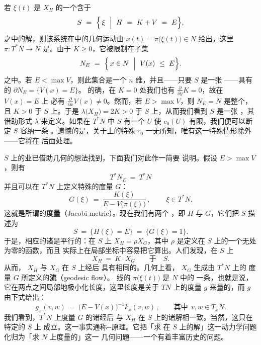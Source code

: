 若 $\xi(t)$ 是\trHamiltonianVectorField{} $X_{H}$ 的一个含于\trInvariant%
\trEnergySurface
\begin{equation}\label{eq:SE-energy-level}
S\ =\ \Bigl\{\,\xi\ \Bigm|\ H\ =\ K+V\ =\ E\Bigr\},
\end{equation}
之中的解，则该系统在\trConfigurationSpace{}中的几何运动由%
$x(t)=\pi\bigl(\xi(t)\bigr)\in N$ 给出，这里 $\pi:T^{*}N\to N$ 是\trProjection。由于%
$K\geq0$，它被限制在子集
\begin{equation}\label{eq:NE-confined}
N_{E}\ =\ \Bigl\{\,x\in N\ \Bigm|\ V(x)\ \leq\ E\Bigr\}.
\end{equation}
之中。若 $E<\max V$，则此集合是一个 $n$ 维\trManifold，并且——只要 $S$ 是一张%
\trRegular\trEnergySurface——具有\trSmooth{}的\trBoundary{} $\partial N_{E}=\bigl\{V(x)=E\bigr\}$。%
的确，在 $K=0$ 处我们也有 $\tfrac{\partial}{\partial y}K=0$，故在 $V(x)=E$ 上%
必有 $\tfrac{\partial}{\partial x}V(x)\neq0$。然而，若 $E>\max V$，则%
$N_{E}=N$ 是整个\trConfigurationSpace，且 $K>0$ 于 $S$ 上。于是%
$\lambda\bigl(X_{H}\bigr)=2K>0$ 于 $S$ 上，从而我们看到 $S$ 是一张%
\trContactType\trHypersurface，其\trContactStructure{}借助\trLiouville{}形式%
$\lambda$ 来定义。如果在 $T^{*}N$ 中 $S$ 有一个\trNeighborhood{} $U$ 使%
\trCapacity{} $c_{0}(U)$ 有限，我们便可以断定 $S$ 容纳一条%
\trClosedCharacteristic。遗憾的是，关于\trCotangentBundle{}上的特殊%
\trCapacity{} $c_{0}$ 一无所知，唯有\trTorus{}这一特殊情形除外——它将在%
后面处理。

$S$ 上的\trPeriodicSolution{}业已借助几何的想法找到，下面我们对此作一简要%
说明。假设 $E>\max V$，则有
\[
T^{*}N_{E}\ =\ T^{*}N
\]
并且可以在 $T^{*}N$ 上定义特殊的\trRiemann{}度量 $G$：
\[
G(\xi)\ =\ \frac{K(\xi)}{E-V\bigl(\pi(\xi)\bigr)}\,,\qquad\ \xi\in T^{*}N.
\]
这就是所谓的\textbf{\trJacobi{}度量}（Jacobi metric）。现在我们有两个%
\trHamiltonianFunction，即 $H$ 与 $G$，它们把 $S$ 描述为\trRegular%
\trEnergySurface
\[
S\ =\ \bigl\{H(\xi)=E\bigr\}\ =\ \bigl\{G(\xi)=1\bigr\}.
\]
于是，相应的诸\trHamiltonianVectorField{}是平行的：在 $S$ 上%
$X_{H}=\rho X_{G}$，其中 $\rho$ 是定义在 $S$ 上的一个无处为零的函数，而且%
实际上在局部坐标中容易把它算出。人们发现，在 $S$ 上
\[
X_{H}\ =\ K\cdot X_{G}\qquad\text{于}\quad S.
\]
从而，\trVectorField{} $X_{H}$ 与 $X_{G}$ 在 $S$ 上经\trReparametrization{}后%
具有相同的\trOrbit。几何上看，\trVectorField{} $X_{G}$ 生成由 $T^{*}N$ 上的%
\trRiemann{}度量 $G$ 所定义的\textbf{\trGeodesic{}流}（geodesic flow）。%
\trFlow{}线的\trProjection{} $\pi\bigl(\xi(t)\bigr)$ 是\trConfigurationSpace{} $N$ 中的%
一条\trGeodesic，也就是说，它在两点之间局部地极小化长度，这里长度是关于%
$TN$ 上的度量 $g$ 来量的，而 $g$ 由下式给出：
\[
g_{x}(v,w)\ =\ \bigl(E-V(x)\bigr)^{-1}k_{x}(v,w)\,,\qquad\text{其中}\ \ %
v,w\in T_{x}N.
\]
我们看到，$T^{*}N$ 上\trRiemann{}度量 $G$ 的诸\trGeodesic{}经\trReparametrization{}后%
与 $X_{H}$ 在 $S$ 上的诸解相一致。当然，这只在特定的\trEnergySurface{} $S$ 上%
成立。这一事实通称\trEuler-\trMaupertuis-\trJacobi{}原理。它把「求\trHamiltonianVectorField{}%
在 $S$ 上的解」这一动力学问题化归为「求 $N$ 上\trJacobi{}度量的\trGeodesic」这一%
几何问题——一个有着丰富历史的问题。


